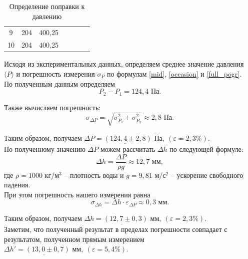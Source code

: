 \documentclass[a4paper, 12pt]{article}
\begin{document}
\begin{table}[H]
\begin{tabular}{ccccccc}
                \multicolumn{1}{|c|}{9} & \multicolumn{1}{c|}{204} & \multicolumn{1}{c|}{400,25} & \multicolumn{1}{c|}{} & \multicolumn{1}{c|}{} & \multicolumn{1}{c|}{} & \multicolumn{1}{c|}{} \\ \cline{1-3}
                \multicolumn{1}{|c|}{10} & \multicolumn{1}{c|}{204} & \multicolumn{1}{c|}{400,25} & \multicolumn{1}{c|}{} & \multicolumn{1}{c|}{} & \multicolumn{1}{c|}{} & \multicolumn{1}{c|}{} \\ \hline
    	\end{tabular}
    	\caption{Определение поправки к давлению}
    	\label{tab:popravka}
    \end{table}

    \noindent Исходя из экспериментальных данных, определяем среднее значение давления $\langle P \rangle$ и погрешность измерения $\sigma_{P}$ по формулам \eqref{mid}, \eqref{occasion} и \eqref{full_pogr}.\\

    \noindent По полученным данным определяем \[ P_2-P_1 = 124,4 \text{ Па}. \]

    \noindent Также вычисляем погрешность:  
    \begin{equation}
        \label{pogr_sum}
        \sigma_{\Delta P} = \sqrt{\sigma^2_{P_1}+\sigma^2_{P_2}} \approx 2,8 \text{ Па}.
    \end{equation}

    \noindent Таким образом, получаем $\underline{\Delta P = (124,4 \pm 2,8) \text{ Па},} \: (\varepsilon = 2,3\%).$\\

    \noindent По полученному значению $\Delta P$ можем рассчитать $\Delta h$ по следующей формуле: \[ \Delta h = \frac{\Delta P}{\rho g} \approx 12,7 \text{ мм}, \] где $ \rho = 1000 $ кг/$ \text{м}^3 $ -- плотность воды и $g = 9,81$ м/$\text{с}^2$ -- ускорение свободного падения.\\
    
    \noindent При этом погрешность нашего измерения равна \[ \sigma_{\Delta h} = \Delta h \cdot \varepsilon_{\Delta P} \approx 0,3 \text{ мм}. \]

    \noindent Таким образом, получаем $\underline{\Delta h = (12,7 \pm 0,3) \text{ мм}}, \: (\varepsilon = 2,3\%).$\\
    
    \noindent Заметим, что полученный результат в пределах погрешности совпадает с результатом, полученном прямым измерением $ \underline{\Delta h' = (13,0 \pm 0,7) \text{ мм},} \: (\varepsilon = 5,4\%). $\\
\end{document}
